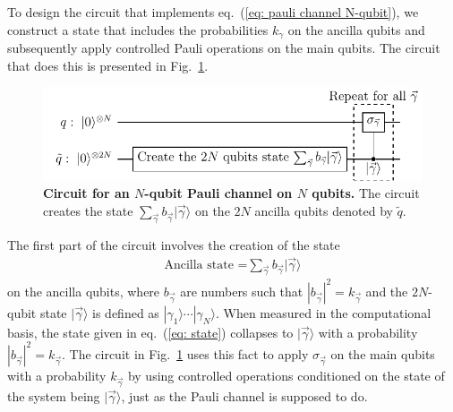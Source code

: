 \documentclass[10pt,letterpaper]{article} %
\newcommand{\fref}[1]{Fig.~\ref{#1}}
\newcommand{\eref}[1]{eq.~(\ref{#1})}
\begin{document}
To design the circuit that implements \eref{eq: pauli channel N-qubit}, we construct a state that 
includes the probabilities $k_{\gamma}$ on the ancilla qubits and subsequently
apply controlled Pauli operations on the main qubits.  The circuit that does
this is presented in \fref{fig: circuit-pauli}. 


\begin{figure} %
\centering
\includegraphics{images/circuito_general.pdf}
\caption{{\bf Circuit for an $N$-qubit
Pauli channel on $N$ qubits.}
The circuit creates the state $\sum_{\vec{\gamma}} b_{\vec{\gamma}}|\vec{\gamma}\rangle$ 
on the $2N$ ancilla qubits denoted by $\tilde{q}$. }
\label{fig: circuit-pauli}
\end{figure} %

The first part of the circuit involves the creation of the state
\begin{eqnarray}
\label{eq: state}
\text{Ancilla state =} 
\sum_{\vec{\gamma}} b_{\vec{\gamma}} |\vec{\gamma} \rangle
\end{eqnarray}
on the ancilla qubits, where $b_{\vec{\gamma}}$ are numbers such that $
|b_{\vec{\gamma}}|^2 = k_{\vec{\gamma}}$ and
the $2N$-qubit state $|\vec{\gamma}\rangle$ is defined as $|\gamma_1\rangle
\cdots |\gamma_N\rangle$.
When measured in the computational basis, the state given in \eref{eq: state}
collapses to $|\vec{\gamma}\rangle$ with a 
probability $|b_{\vec{\gamma}}|^2 = k_{\vec\gamma}$. 
The circuit in \fref{fig: circuit-pauli} uses this fact
to apply $\sigma_{\vec{\gamma}}$ on the main qubits
with a probability $k_{\vec\gamma}$ by using controlled operations 
conditioned on the state of the system being $|\vec{\gamma}\rangle$,
just as the Pauli channel is supposed to do.  
% 
% 
\end{document}

